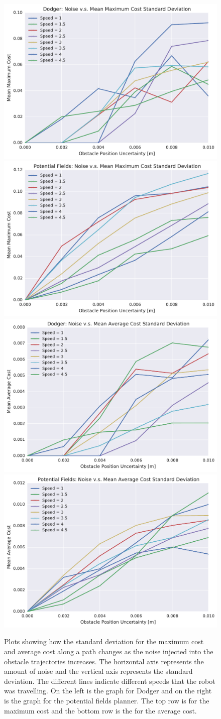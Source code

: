 \begin{figure}[h!]
    \centering
    \includegraphics[width=0.48\linewidth]{figs/planner_std_max_cost_0}
    \includegraphics[width=0.48\linewidth]{figs/pf_std_max_cost_0} \\
    \includegraphics[width=0.48\linewidth]{figs/planner_std_avg_cost_0}
    \includegraphics[width=0.48\linewidth]{figs/pf_std_avg_cost_0}

    \caption{Plots showing how the standard deviation for the maximum cost and
        average cost along a path changes as the noise injected into the
        obstacle trajectories increases. The horizontal axis represents the
        amount of noise and the vertical axis represents the standard
        deviation. The different lines indicate different speeds that the robot
        was travelling. On the left is the graph for Dodger and on the right is
    the graph for the potential fields planner. The top row is for the maximum
cost and the bottom row is the for the average cost.}

    \label{fig:plot_std_cost}
\end{figure}

